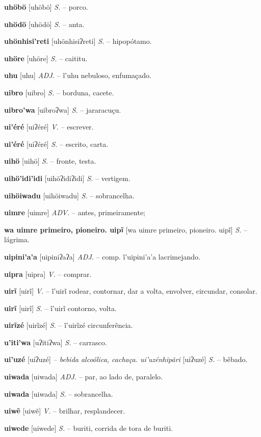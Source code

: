 \textbf{uhöbö} [uhöbö] \textit{S.} -- porco.

\textbf{uhödö} [uhödö] \textit{S.} -- anta.

\textbf{uhönhisi'reti} [uhönhisiʔreti] \textit{S.} -- hipopótamo.

\textbf{uhöre} [uhöre] \textit{S.} -- caititu.

\textbf{uhu} [uhu] \textit{ADJ.} -- ĩ'uhu nebuloso, enfumaçado.

\textbf{uibro} [uibro] \textit{S.} -- borduna, cacete.

\textbf{uibro'wa} [uibroʔwa] \textit{S.} -- jararacuçu.

\textbf{ui'éré} [uiʔéré] \textit{V.} -- escrever.

\textbf{ui'éré} [uiʔéré] \textit{S.} -- escrito, carta.

\textbf{uihö} [uihö] \textit{S.} -- fronte, testa.

\textbf{uihö'idi'idi} [uihöʔidiʔidi] \textit{S.} -- vertigem.

\textbf{uihöiwadu} [uihöiwadu] \textit{S.} -- sobrancelha.

\textbf{uimre} [uimre] \textit{ADV.} -- antes, primeiramente;

\textbf{wa uimre primeiro, pioneiro. uipĩ} [wa uimre primeiro, pioneiro. uipĩ] \textit{S.} -- lágrima.

\textbf{uipini'a'a} [uipiniʔaʔa] \textit{ADJ.} -- comp. ĩ'uipini'a'a lacrimejando.

\textbf{uipra} [uipra] \textit{V.} -- comprar.

\textbf{uirĩ} [uirĩ] \textit{V.} -- ĩ'uirĩ rodear, contornar, dar a volta, envolver, circundar, consolar.

\textbf{uirĩ} [uirĩ] \textit{S.} -- ĩ'uirĩ contorno, volta.

\textbf{uirĩzé} [uirĩzé] \textit{S.} -- ĩ'uirĩzé circunferência.

\textbf{u'iti'wa} [uʔitiʔwa] \textit{S.} -- carrasco.

\textbf{ui'uzé} [uiʔuzé] \textit{-- bebida alcoólica, cachaça. ui'uzénhipãri} [uiʔuzé] \textit{S.} -- bêbado.

\textbf{uiwada} [uiwada] \textit{ADJ.} -- par, ao lado de, paralelo.

\textbf{uiwada} [uiwada] \textit{S.} -- sobrancelha.

\textbf{uiwẽ} [uiwẽ] \textit{V.} -- brilhar, resplandecer.

\textbf{uiwede} [uiwede] \textit{S.} -- buriti, corrida de tora de buriti.

